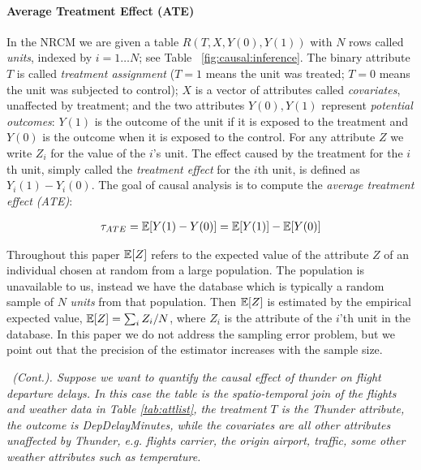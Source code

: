 \vspace{-.3cm}

\paragraph*{Average Treatment Effect (ATE)}
In the NRCM we are given a table $R(T,X,Y(0),Y(1))$ with $N$ rows called {\em units},
indexed by $i=1 \ldots N$; see Table~ \ref{fig:causal:inference}.
The binary attribute $T$ is called {\em treatment assignment}
($T=1$ means the unit was treated; $T=0$ means the unit was subjected to control);
$X$ is a vector of attributes called {\em covariates}, unaffected by treatment;
and the two attributes $Y(0), Y(1)$ represent {\em potential outcomes}:
$Y(1)$ is the outcome of the unit if it is exposed to the treatment and
$Y(0)$ is the outcome when it is exposed to the control.
For any attribute $Z$ we write $Z_i$ for the value of the $i$'s unit.
The effect caused by the treatment for the $i$th unit,
simply called the {\em treatment effect} for the $i$th unit, is defined as $Y_i(1)-Y_i(0)$.
The goal of causal analysis is to compute the {\em average treatment effect (ATE)}:


\vspace{-.4cm}
\begin{align}
  \ate = \E[Y(1)-Y(0)] = \E[Y(1)] - \E[Y(0)] \ignore{=\frac{1}{N} \sum_i (Y_i(1)-Y_i(0))}  \label{eq:ate}
\end{align}


Throughout this paper $\E[Z]$ refers to the expected value of the
attribute $Z$ of an individual chosen at random from a large
population.  The population is unavailable to us, instead we have the
database which is typically a random sample of $N$ {\em units} from
that population.  Then $\E[Z]$ is estimated by the empirical expected
value, $\E[Z] = \sum_i Z_i/N$, where $Z_i$ is the attribute of the
$i$'th unit in the database.  In this paper we do not address the
sampling error problem, but we point out that the precision of the
estimator increases with the sample size.  
\vspace{-.15cm}
\begin{example} \em \label{exa1} \delay \ (Cont.). Suppose we want to
  quantify the causal effect of thunder on flight departure delays. In
  this case the table is the spatio-temporal join of the flights and
  weather data in Table \ref{tab:attlist}, the treatment $T$ is the
  Thunder attribute, the outcome is
  DepDelayMinutes, while the covariates are all other attributes
  unaffected by Thunder, e.g. flights carrier, the origin airport,
  traffic, some other weather attributes such as temperature.
\end{example}


